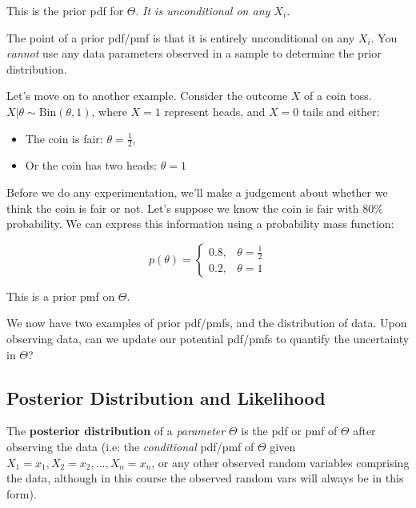 \documentclass[a4paper]{article}
\begin{document}
                This is the prior pdf for $\Theta$. \textit{It is unconditional
                on any $X_i$.}

                \begin{warn}
                    The point of a prior pdf/pmf is that it is entirely
                    unconditional on any $X_i$. You \textit{cannot} use any data
                    parameters observed in a sample to determine the prior
                    distribution.
                \end{warn}

                Let's move on to another example. Consider the outcome $X$ of a
                coin toss. $X | \theta \sim \text{Bin}(\theta, 1)$, where $X =
                1$ represent heads, and $X = 0$ tails and either:

                \begin{itemize}
                    \item The coin is fair: $\theta = \frac{1}{2}$,
                    \item Or the coin has two heads: $\theta = 1$
                \end{itemize}

                Before we do any experimentation, we'll make a judgement about
                whether we think the coin is fair or not. Let's suppose we know
                the coin is fair with 80\% probability. We can express this
                information using a probability mass function:

                \[
                    p(\theta) = \begin{cases}0.8, & \theta = \frac{1}{2} \\ 0.2,
                    & \theta = 1\end{cases}
                \]

                This is a prior pmf on $\Theta$.

                We now have two examples of prior pdf/pmfs, and the distribution
                of data. Upon observing data, can we update our potential
                pdf/pmfs to quantify the uncertainty in $\Theta$?

        \subsection{Posterior Distribution and Likelihood}
            \begin{definition}
                The \textbf{posterior distribution} of a \textit{parameter}
                $\Theta$ is the pdf or pmf of $\Theta$ after observing the data
                (i.e: the \textit{conditional} pdf/pmf of $\Theta$ given $X_1 =
                x_1, X_2 = x_2, ..., X_n = x_n$, or any other observed random
                variables comprising the data, although in this course the
                observed random vars will always be in this form).
            \end{definition}
\end{document}
